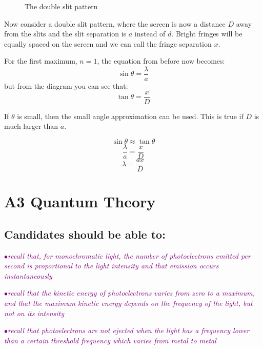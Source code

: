\documentclass[a4paper,11pt,twoside]{memoir}
\newcounter{spec}[chapter]
\newcommand{\spec}[1]{\Needspace{5\baselineskip}\textcolor{purple}{$\bullet$\hspace{0.5cm}\textit{#1}}}
\begin{document}
\newpage

\begin{figure}[h]
    \centering
    \caption{The double slit pattern}
    \label{doubleslitscreen}
\end{figure}

Now consider a double slit pattern, where the screen is now a distance $D$ away from the slits and the slit separation is $a$ instead of $d$. Bright fringes will be equally spaced on the screen and we can call the fringe separation $x$.



For the first maximum, $n=1$, the equation from before now becomes:
$$\sin\theta = \frac{\lambda}{a}$$
but from the diagram you can see that:
$$\tan\theta = \frac{x}{D}$$

If $\theta$ is small, then the small angle approximation can be used. This is true if $D$ is much larger than $a$.

$$\sin\theta \approx \tan\theta$$
$$\frac{\lambda}{a} = \frac{x}{D}$$
$$\lambda = \frac{ax}{D}$$

\chapter{A3 Quantum Theory}
\setcounter{spec}{0}
\section*{Candidates should be able to:}

\spec{recall that, for monochromatic light, the number of photoelectrons emitted per second is proportional to the light intensity and that emission occurs instantaneously}

\spec{recall that the kinetic energy of photoelectrons varies from zero to a maximum, and that the maximum kinetic energy depends on the frequency of the light, but not on its intensity}

\spec{recall that photoelectrons are not ejected when the light has a frequency lower than a certain threshold frequency which varies from metal to metal}
\end{document}
